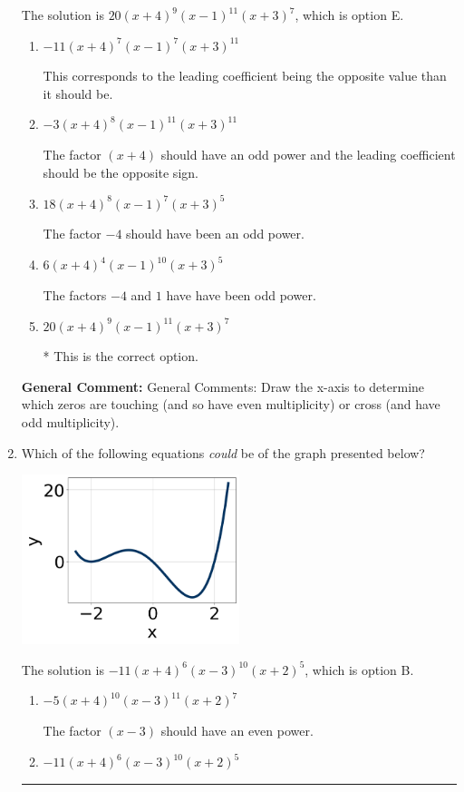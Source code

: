 \documentclass{extbook}[14pt]
\newcommand{\litem}[1]{\item #1

\rule{\textwidth}{0.4pt}}
\begin{document}
\begin{enumerate}
{The solution is \( 20(x + 4)^{9} (x - 1)^{11} (x + 3)^{7} \), which is option E.\begin{enumerate}[label=\Alph*.]
\item \( -11(x + 4)^{7} (x - 1)^{7} (x + 3)^{11} \)

This corresponds to the leading coefficient being the opposite value than it should be.
\item \( -3(x + 4)^{8} (x - 1)^{11} (x + 3)^{11} \)

The factor $(x + 4)$ should have an odd power and the leading coefficient should be the opposite sign.
\item \( 18(x + 4)^{8} (x - 1)^{7} (x + 3)^{5} \)

The factor $-4$ should have been an odd power.
\item \( 6(x + 4)^{4} (x - 1)^{10} (x + 3)^{5} \)

The factors $-4$ and $1$ have have been odd power.
\item \( 20(x + 4)^{9} (x - 1)^{11} (x + 3)^{7} \)

* This is the correct option.
\end{enumerate}

\textbf{General Comment:} General Comments: Draw the x-axis to determine which zeros are touching (and so have even multiplicity) or cross (and have odd multiplicity).
}
\litem{
Which of the following equations \textit{could} be of the graph presented below?

\begin{center}
    \includegraphics[width=0.5\textwidth]{../Figures/polyGraphToFunctionA.png}
\end{center}


The solution is \( -11(x + 4)^{6} (x - 3)^{10} (x + 2)^{5} \), which is option B.\begin{enumerate}[label=\Alph*.]
\item \( -5(x + 4)^{10} (x - 3)^{11} (x + 2)^{7} \)

The factor $(x - 3)$ should have an even power.
\item \( -11(x + 4)^{6} (x - 3)^{10} (x + 2)^{5} \)


\end{enumerate}}
\end{enumerate}
\end{document}
